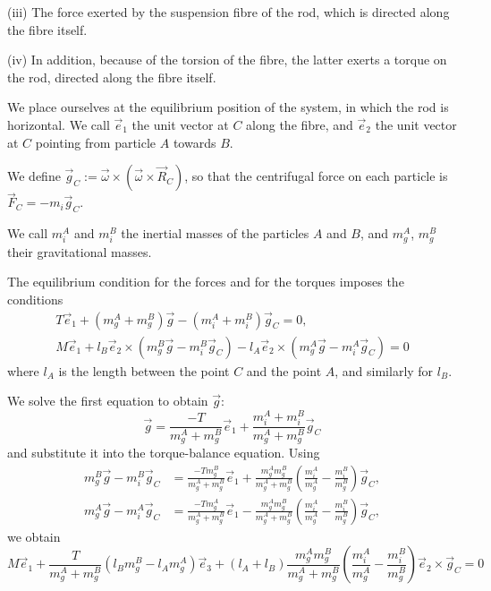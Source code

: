 \begin{points}
(iii) The force exerted by the suspension fibre of the rod, which is directed along the fibre itself.

(iv) In addition, because of the torsion of the fibre, the latter exerts a torque on the rod, directed along the fibre itself.

\item We place ourselves at the equilibrium position of the system, in which the rod is horizontal. We call $\vec e_1$ the unit vector at $C$ along the fibre, and $\vec e_2$ the unit vector at $C$ pointing from particle $A$ towards $B$.

\item We define $\vec g_C:=\vec\omega\times\left(\vec\omega\times\vec R_C\right)$, so that the centrifugal force on each particle is $\vec F_C=-m_i\vec g_C$.

\item We call $m_i^A$ and $m_i^B$ the inertial masses of the particles $A$ and $B$, and $m_g^A$, $m_g^B$ their gravitational masses.

\item The equilibrium condition for the forces and for the torques imposes the conditions
\begin{gather*}
  T\vec e_1+(m_g^A+m_g^B)\vec g-(m_i^A+m_i^B)\vec g_C=0,\\
  M\vec e_1+l_B\vec e_2\times\left(m_g^B\vec g-m_i^B\vec g_C\right)-l_A\vec e_2\times\left(m_g^A\vec g-m_i^A\vec g_C\right)=0
\end{gather*}
where $l_A$ is the length between the point $C$ and the point $A$, and similarly for $l_B$.

\item We solve the first equation to obtain $\vec g$:
\[
  \vec g=\frac{-T}{m_g^A+m_g^B}\vec e_1+\frac{m_i^A+m_i^B}{m_g^A+m_g^B}\vec g_C
\]
and substitute it into the torque-balance equation. Using
\begin{align*}
  m_g^B\vec g-m_i^B\vec g_C&=\frac{-Tm_g^B}{m_g^A+m_g^B}\vec e_1+\frac{m_g^Am_g^B}{m_g^A+m_g^B}\left(\frac{m_i^A}{m_g^A}-\frac{m_i^B}{m_g^B}\right)\vec g_C,\\
  m_g^A\vec g-m_i^A\vec g_C&=\frac{-Tm_g^A}{m_g^A+m_g^B}\vec e_1-\frac{m_g^Am_g^B}{m_g^A+m_g^B}\left(\frac{m_i^A}{m_g^A}-\frac{m_i^B}{m_g^B}\right)\vec g_C,
\end{align*}
we obtain
\[
  M\vec e_1+\frac{T}{m_g^A+m_g^B}\left(l_Bm_g^B-l_Am_g^A\right)\vec e_3+(l_A+l_B)\frac{m_g^Am_g^B}{m_g^A+m_g^B}\left(\frac{m_i^A}{m_g^A}-\frac{m_i^B}{m_g^B}\right)\vec e_2\times\vec g_C=0
\]


\end{points}
